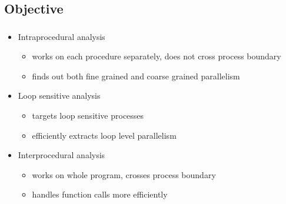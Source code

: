 \documentclass{beamer}
\begin{document}
\subsection{Objective}
\frame
{
	\frametitle{\subsecname}
	\begin{itemize}
	\item Intraprocedural analysis 
	\begin{itemize}
	\item works on each procedure separately, does not cross process boundary
	\item finds out both fine grained and coarse grained parallelism
	\end{itemize}
	\pause
	\item Loop sensitive analysis 
	\begin{itemize}
	\item targets loop sensitive processes
	\item efficiently extracts loop level parallelism
	\end{itemize}
	\pause
	\item Interprocedural analysis 
	\begin{itemize}
	\item works on whole program, crosses process boundary
	\item handles function calls more efficiently
	\end{itemize}
	\end{itemize}
}
\end{document}
